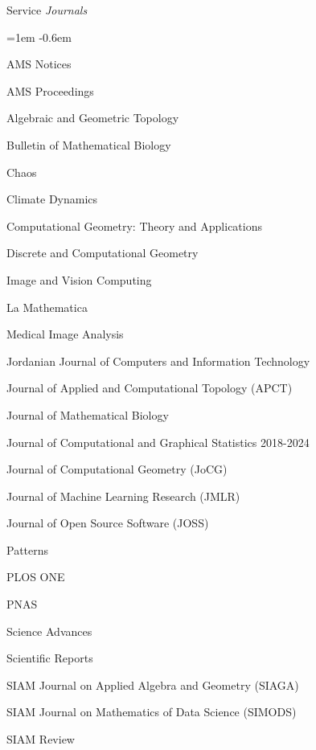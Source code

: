 \documentclass{resume} %
\begin{document}
\begin{rSection}{Service}
\textit{Journals}
\begin{list}{}{\leftmargin=1em}
   \itemsep -0.6em \vspace{-0.5em} %
   \item AMS Notices %
   \item AMS Proceedings %
   \item Algebraic and Geometric Topology %
   \item Bulletin of Mathematical Biology %
   \item Chaos%
   \item Climate Dynamics %
   \item Computational Geometry: Theory and Applications %
   \item Discrete and Computational Geometry%
   \item Image and Vision Computing %
   \item La Mathematica %
   \item Medical Image Analysis %
   \item Jordanian Journal of Computers and Information Technology %
   \item Journal of Applied and Computational Topology (APCT) %
   \item Journal of Mathematical Biology %
   \item  Journal of Computational and Graphical Statistics %
   2018-2024
   \item Journal of Computational Geometry (JoCG) %
   \item Journal of Machine Learning Research (JMLR) %
   \item Journal of Open Source Software (JOSS) %
   \item Patterns %
   \item PLOS ONE %
   \item PNAS %
   \item Science Advances %
   \item Scientific Reports %
   \item SIAM Journal on Applied Algebra and Geometry (SIAGA) %
   \item SIAM Journal on Mathematics of Data Science (SIMODS) %
   \item SIAM Review %

\end{list}
\end{rSection}
\end{document}
